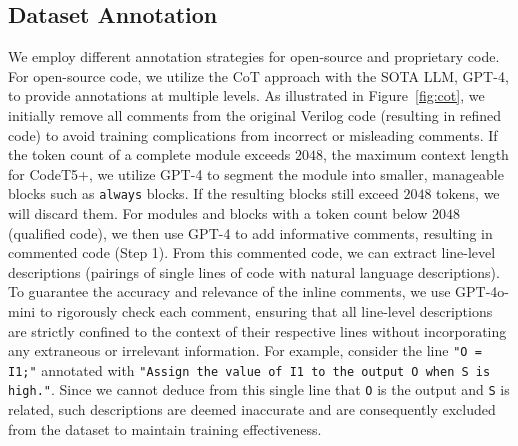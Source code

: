 \subsection{Dataset Annotation}
We employ different annotation strategies for open-source and proprietary code. For open-source code, we utilize the CoT approach with the SOTA LLM, GPT-4, to provide annotations at multiple levels. As illustrated in Figure~\ref{fig:cot}, 
we initially remove all comments from the original Verilog code (resulting in refined code) to avoid training complications from incorrect or misleading comments.
If the token count of a complete module exceeds $2048$, the maximum context length for CodeT5+, we utilize GPT-4 to segment the module into smaller, manageable blocks such as \texttt{always} blocks. 
If the resulting blocks still exceed $2048$ tokens, we will discard them. 
For modules and blocks with a token count below $2048$ (qualified code), we then use GPT-4 to add informative comments, resulting in commented code (Step 1).
From this commented code, we can extract line-level descriptions (pairings of single lines of code with natural language descriptions). To guarantee the accuracy and relevance of the inline comments, we use GPT-4o-mini to rigorously check each comment, ensuring that all line-level descriptions are strictly confined to the context of their respective lines without incorporating any extraneous or irrelevant information. For example, consider the line \texttt{"O = I1;"} annotated with \texttt{"Assign the value of I1 to the output O when S is high."}.
Since we cannot deduce from this single line that \texttt{O} is the output and \texttt{S} is related, such descriptions are deemed inaccurate and are consequently excluded from the dataset to maintain training effectiveness.
